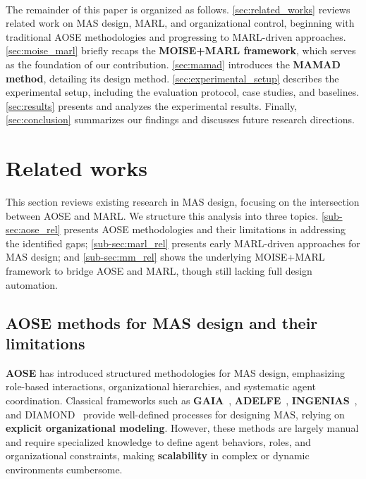 \documentclass[pdflatex,sn-mathphys-num]{sn-jnl}%
\theoremstyle{thmstyleone}%
\theoremstyle{thmstyletwo}%
\theoremstyle{thmstylethree}%
\begin{document}
\

The remainder of this paper is organized as follows. \autoref{sec:related_works} reviews related work on MAS design, MARL, and organizational control, beginning with traditional AOSE methodologies and progressing to MARL-driven approaches. \autoref{sec:moise_marl} briefly recaps the \textbf{MOISE+MARL framework}, which serves as the foundation of our contribution. \autoref{sec:mamad} introduces the \textbf{MAMAD method}, detailing its design method. \autoref{sec:experimental_setup} describes the experimental setup, including the evaluation protocol, case studies, and baselines. \autoref{sec:results} presents and analyzes the experimental results. Finally, \autoref{sec:conclusion} summarizes our findings and discusses future research directions.

\clearpage

\section{Related works}\label{sec:related_works}

This section reviews existing research in MAS design, focusing on the intersection between AOSE and MARL. We structure this analysis into three topics. \autoref{sub-sec:aose_rel} presents AOSE methodologies and their limitations in addressing the identified gaps; \autoref{sub-sec:marl_rel} presents early MARL-driven approaches for MAS design; and \autoref{sub-sec:mm_rel} shows the underlying MOISE+MARL framework to bridge AOSE and MARL, though still lacking full design automation.

\subsection{AOSE methods for MAS design and their limitations}\label{sub-sec:aose_rel}

\textbf{AOSE} has introduced structured methodologies for MAS design, emphasizing role-based interactions, organizational hierarchies, and systematic agent coordination. Classical frameworks such as \textbf{GAIA}~\cite{gaia1998}, \textbf{ADELFE}~\cite{adelfe2002}, \textbf{INGENIAS}~\cite{ingenias2004}, and DIAMOND~\cite{Jamont2005} provide well-defined processes for designing MAS, relying on \textbf{explicit organizational modeling}. However, these methods are largely manual and require specialized knowledge to define agent behaviors, roles, and organizational constraints, making \textbf{scalability} in complex or dynamic environments cumbersome.
\end{document}
